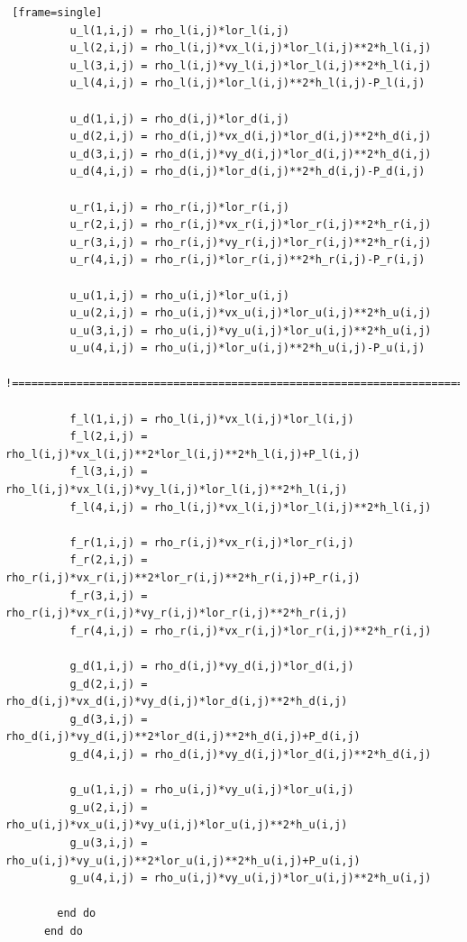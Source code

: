 \documentclass[12pt,a4paper]{book}
\begin{document}
\begin{lstlisting} [frame=single]
          u_l(1,i,j) = rho_l(i,j)*lor_l(i,j)
          u_l(2,i,j) = rho_l(i,j)*vx_l(i,j)*lor_l(i,j)**2*h_l(i,j)
          u_l(3,i,j) = rho_l(i,j)*vy_l(i,j)*lor_l(i,j)**2*h_l(i,j)
          u_l(4,i,j) = rho_l(i,j)*lor_l(i,j)**2*h_l(i,j)-P_l(i,j)

          u_d(1,i,j) = rho_d(i,j)*lor_d(i,j)
          u_d(2,i,j) = rho_d(i,j)*vx_d(i,j)*lor_d(i,j)**2*h_d(i,j)
          u_d(3,i,j) = rho_d(i,j)*vy_d(i,j)*lor_d(i,j)**2*h_d(i,j)
          u_d(4,i,j) = rho_d(i,j)*lor_d(i,j)**2*h_d(i,j)-P_d(i,j)

          u_r(1,i,j) = rho_r(i,j)*lor_r(i,j)
          u_r(2,i,j) = rho_r(i,j)*vx_r(i,j)*lor_r(i,j)**2*h_r(i,j)
          u_r(3,i,j) = rho_r(i,j)*vy_r(i,j)*lor_r(i,j)**2*h_r(i,j)
          u_r(4,i,j) = rho_r(i,j)*lor_r(i,j)**2*h_r(i,j)-P_r(i,j)

          u_u(1,i,j) = rho_u(i,j)*lor_u(i,j)
          u_u(2,i,j) = rho_u(i,j)*vx_u(i,j)*lor_u(i,j)**2*h_u(i,j)
          u_u(3,i,j) = rho_u(i,j)*vy_u(i,j)*lor_u(i,j)**2*h_u(i,j)
          u_u(4,i,j) = rho_u(i,j)*lor_u(i,j)**2*h_u(i,j)-P_u(i,j)

!==========================================================================

          f_l(1,i,j) = rho_l(i,j)*vx_l(i,j)*lor_l(i,j)
          f_l(2,i,j) = rho_l(i,j)*vx_l(i,j)**2*lor_l(i,j)**2*h_l(i,j)+P_l(i,j)
          f_l(3,i,j) = rho_l(i,j)*vx_l(i,j)*vy_l(i,j)*lor_l(i,j)**2*h_l(i,j)
          f_l(4,i,j) = rho_l(i,j)*vx_l(i,j)*lor_l(i,j)**2*h_l(i,j)

          f_r(1,i,j) = rho_r(i,j)*vx_r(i,j)*lor_r(i,j)
          f_r(2,i,j) = rho_r(i,j)*vx_r(i,j)**2*lor_r(i,j)**2*h_r(i,j)+P_r(i,j)
          f_r(3,i,j) = rho_r(i,j)*vx_r(i,j)*vy_r(i,j)*lor_r(i,j)**2*h_r(i,j)
          f_r(4,i,j) = rho_r(i,j)*vx_r(i,j)*lor_r(i,j)**2*h_r(i,j)

          g_d(1,i,j) = rho_d(i,j)*vy_d(i,j)*lor_d(i,j)
          g_d(2,i,j) = rho_d(i,j)*vx_d(i,j)*vy_d(i,j)*lor_d(i,j)**2*h_d(i,j)
          g_d(3,i,j) = rho_d(i,j)*vy_d(i,j)**2*lor_d(i,j)**2*h_d(i,j)+P_d(i,j)
          g_d(4,i,j) = rho_d(i,j)*vy_d(i,j)*lor_d(i,j)**2*h_d(i,j)

          g_u(1,i,j) = rho_u(i,j)*vy_u(i,j)*lor_u(i,j)
          g_u(2,i,j) = rho_u(i,j)*vx_u(i,j)*vy_u(i,j)*lor_u(i,j)**2*h_u(i,j)
          g_u(3,i,j) = rho_u(i,j)*vy_u(i,j)**2*lor_u(i,j)**2*h_u(i,j)+P_u(i,j)
          g_u(4,i,j) = rho_u(i,j)*vy_u(i,j)*lor_u(i,j)**2*h_u(i,j)

        end do
      end do


\end{lstlisting}
\end{document}
